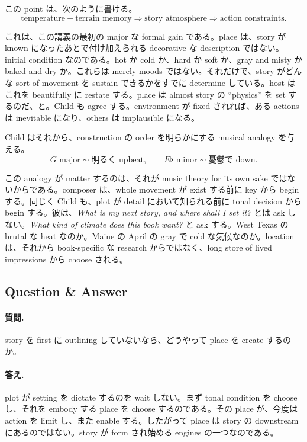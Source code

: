 この point は、次のように書ける。
\begin{equation}
\text{temperature} + \text{terrain memory} \Longrightarrow \text{story atmosphere} \Longrightarrow \text{action constraints}.
\end{equation}

これは、この講義の最初の major な formal gain である。place は、story が known になったあとで付け加えられる decorative な description ではない。initial condition なのである。hot か cold か、hard か soft か、gray and misty か baked and dry か。これらは merely moods ではない。それだけで、story がどんな sort of movement を sustain できるかをすでに determine している。host はこれを beautifully に restate する。place は almost story の ``physics'' を set するのだ、と。Child も agree する。environment が fixed されれば、ある actions は inevitable になり、others は implausible になる。

Child はそれから、construction の order を明らかにする musical analogy を与える。
\begin{equation}
G\text{ major} \sim \text{明るく upbeat}, \qquad
E\flat \text{ minor} \sim \text{憂鬱で down}.
\end{equation}

この analogy が matter するのは、それが music theory for its own sake ではないからである。composer は、whole movement が exist する前に key から begin する。同じく Child も、plot が detail において知られる前に tonal decision から begin する。彼は、\emph{What is my next story, and where shall I set it?} とは ask しない。\emph{What kind of climate does this book want?} と ask する。West Texas の brutal な heat なのか。Maine の April の gray で cold な気候なのか。location は、それから book-specific な research からではなく、long store of lived impressions から choose される。

\subsection{Question \& Answer}

\paragraph{質問.} story を first に outlining していないなら、どうやって place を create するのか。

\paragraph{答え.} plot が setting を dictate するのを wait しない。まず tonal condition を choose し、それを embody する place を choose するのである。その place が、今度は action を limit し、また enable する。したがって place は story の downstream にあるのではない。story が form され始める engines の一つなのである。

